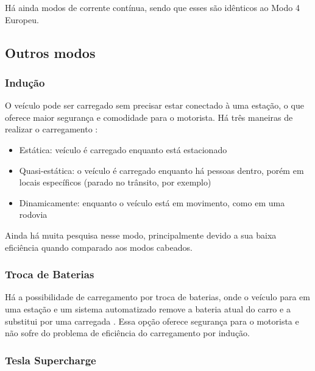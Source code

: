       Há ainda modos de corrente contínua, sendo que esses são idênticos ao Modo 4 Europeu.

    \subsection{Outros modos}
    \label{stateofart:modes:other}

      \subsubsection{Indução}
      \label{stateofart:modes:other:induction}

        O veículo pode ser carregado sem precisar estar conectado à uma estação, o que oferece maior segurança e comodidade para o motorista. Há três maneiras de realizar o carregamento \cite{ieee-review-evse}:

        \begin{itemize}
          \item Estática: veículo é carregado enquanto está estacionado
          \item Quasi-estática: o veículo é carregado enquanto há pessoas dentro, porém em locais específicos (parado no trânsito, por exemplo)
          \item Dinamicamente: enquanto o veículo está em movimento, como em uma rodovia
        \end{itemize}

        Ainda há muita pesquisa nesse modo, principalmente devido a sua baixa eficiência quando comparado aos modos cabeados.

      \subsubsection{Troca de Baterias}
      \label{stateofart:modes:other:swap}

        Há a possibilidade de carregamento por troca de baterias, onde o veículo para em uma estação e um sistema automatizado remove a bateria atual do carro e a substitui por uma carregada \cite{battery-swap}. Essa opção oferece segurança para o motorista e não sofre do problema de eficiência do carregamento por indução. 

      \subsubsection{Tesla Supercharge}
      \label{stateofart:modes:tesla}

